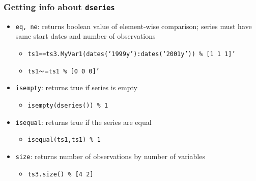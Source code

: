 \documentclass[10pt]{beamer}
\newcommand{\myitem}{\item[$\bullet$]}
\begin{document}
\begin{frame}[fragile,t]
  \frametitle{Getting info about \texttt{dseries}}
  \begin{itemize}
  \myitem \texttt{eq, ne}: returns boolean value of element-wise comparison; series must have same start dates and number of observations
    \begin{itemize}
    \myitem \texttt{ts1==ts3.MyVar1(dates(`1999y'):dates(`2001y')) \% [1 1 1]'}
    \myitem \texttt{ts1$\thicksim$=ts1 \% [0 0 0]'}
    \end{itemize}
  \myitem \texttt{isempty}: returns true if series is empty
    \begin{itemize}
    \myitem \texttt{isempty(dseries()) \% 1}
    \end{itemize}
  \myitem \texttt{isequal}: returns true if the series are equal
    \begin{itemize}
    \myitem \texttt{isequal(ts1,ts1) \% 1}
    \end{itemize}
  \myitem \texttt{size}: returns number of observations by number of variables
    \begin{itemize}
    \myitem \texttt{ts3.size() \% [4 2]}
    \end{itemize}
  \end{itemize}
\end{frame}
\end{document}
